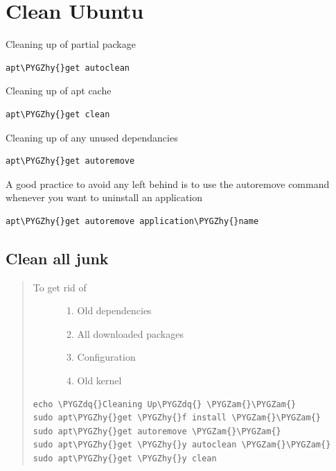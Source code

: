 \documentclass[letterpaper,10pt,english]{sphinxmanual}
\def\PYGZam{\char`\&}
\def\PYGZhy{\char`\-}
\def\PYGZdq{\char`\"}
\begin{document}
\section{Clean Ubuntu}
\label{_source/things/clean_ubuntu:clean-ubuntu}\label{_source/things/clean_ubuntu::doc}
Cleaning up of partial package

\begin{Verbatim}[commandchars=\\\{\}]
apt\PYGZhy{}get autoclean
\end{Verbatim}

Cleaning up of apt cache

\begin{Verbatim}[commandchars=\\\{\}]
apt\PYGZhy{}get clean
\end{Verbatim}

Cleaning up of any unused dependancies

\begin{Verbatim}[commandchars=\\\{\}]
apt\PYGZhy{}get autoremove
\end{Verbatim}

A good practice to avoid any left behind is to use the autoremove command whenever you want to uninstall an application

\begin{Verbatim}[commandchars=\\\{\}]
apt\PYGZhy{}get autoremove application\PYGZhy{}name
\end{Verbatim}


\subsection{Clean all junk}
\label{_source/things/clean_ubuntu:clean-all-junk}\begin{quote}
\begin{description}
\item[{To get rid of}] \leavevmode\begin{enumerate}
\item {} 
Old dependencies

\item {} 
All downloaded packages

\item {} 
Configuration

\item {} 
Old kernel

\end{enumerate}

\end{description}

\begin{Verbatim}[commandchars=\\\{\}]
echo \PYGZdq{}Cleaning Up\PYGZdq{} \PYGZam{}\PYGZam{}
sudo apt\PYGZhy{}get \PYGZhy{}f install \PYGZam{}\PYGZam{}
sudo apt\PYGZhy{}get autoremove \PYGZam{}\PYGZam{}
sudo apt\PYGZhy{}get \PYGZhy{}y autoclean \PYGZam{}\PYGZam{}
sudo apt\PYGZhy{}get \PYGZhy{}y clean
\end{Verbatim}
\end{quote}
\end{document}
